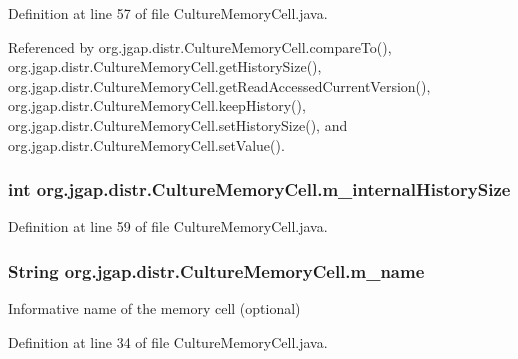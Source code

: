 Definition at line 57 of file Culture\-Memory\-Cell.\-java.



Referenced by org.\-jgap.\-distr.\-Culture\-Memory\-Cell.\-compare\-To(), org.\-jgap.\-distr.\-Culture\-Memory\-Cell.\-get\-History\-Size(), org.\-jgap.\-distr.\-Culture\-Memory\-Cell.\-get\-Read\-Accessed\-Current\-Version(), org.\-jgap.\-distr.\-Culture\-Memory\-Cell.\-keep\-History(), org.\-jgap.\-distr.\-Culture\-Memory\-Cell.\-set\-History\-Size(), and org.\-jgap.\-distr.\-Culture\-Memory\-Cell.\-set\-Value().

\hypertarget{classorg_1_1jgap_1_1distr_1_1_culture_memory_cell_a70c0d54d68970a371d77cb59cbdba1a9}{
\subsubsection[{m\-\_\-internal\-History\-Size}]{\setlength{\rightskip}{0pt plus 5cm}int org.\-jgap.\-distr.\-Culture\-Memory\-Cell.\-m\-\_\-internal\-History\-Size\hspace{0.3cm}{\ttfamily [private]}}}\label{classorg_1_1jgap_1_1distr_1_1_culture_memory_cell_a70c0d54d68970a371d77cb59cbdba1a9}


Definition at line 59 of file Culture\-Memory\-Cell.\-java.

\hypertarget{classorg_1_1jgap_1_1distr_1_1_culture_memory_cell_ac2f8312562f240b39dc29c65a5cc803e}{
\subsubsection[{m\-\_\-name}]{\setlength{\rightskip}{0pt plus 5cm}String org.\-jgap.\-distr.\-Culture\-Memory\-Cell.\-m\-\_\-name\hspace{0.3cm}{\ttfamily [private]}}}\label{classorg_1_1jgap_1_1distr_1_1_culture_memory_cell_ac2f8312562f240b39dc29c65a5cc803e}
Informative name of the memory cell (optional) 

Definition at line 34 of file Culture\-Memory\-Cell.\-java.



